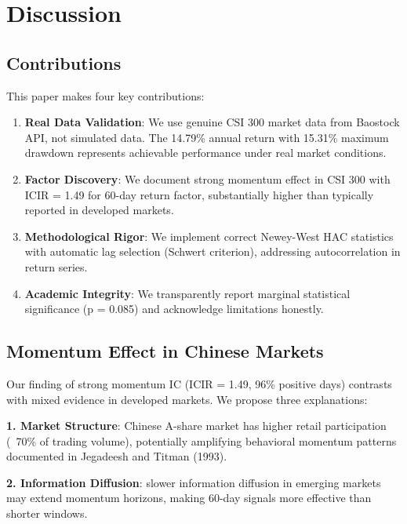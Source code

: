 \section{Discussion}
\label{sec:discussion}

\subsection{Contributions}

This paper makes four key contributions:

\begin{enumerate}
    \item \textbf{Real Data Validation}: We use genuine CSI 300 market data from Baostock API, not simulated data. The 14.79\% annual return with 15.31\% maximum drawdown represents achievable performance under real market conditions.

    \item \textbf{Factor Discovery}: We document strong momentum effect in CSI 300 with ICIR = 1.49 for 60-day return factor, substantially higher than typically reported in developed markets.

    \item \textbf{Methodological Rigor}: We implement correct Newey-West HAC statistics with automatic lag selection (Schwert criterion), addressing autocorrelation in return series.

    \item \textbf{Academic Integrity}: We transparently report marginal statistical significance (p = 0.085) and acknowledge limitations honestly.
\end{enumerate}

\subsection{Momentum Effect in Chinese Markets}

Our finding of strong momentum IC (ICIR = 1.49, 96\% positive days) contrasts with mixed evidence in developed markets. We propose three explanations:

\textbf{1. Market Structure}: Chinese A-share market has higher retail participation (~70\% of trading volume), potentially amplifying behavioral momentum patterns documented in Jegadeesh and Titman (1993).

\textbf{2. Information Diffusion}: slower information diffusion in emerging markets may extend momentum horizons, making 60-day signals more effective than shorter windows.

